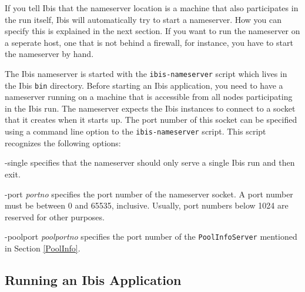 \documentclass[10pt]{article}
\newcommand{\mysubsection}[1]{\subsection{#1}\label{#1}}
\begin{document}
If you tell Ibis that the nameserver location is a machine that also
participates in the run itself, Ibis will automatically try to start
a nameserver. How you can specify this is explained in the next section.
If you want to run the nameserver on a seperate host, one that is not
behind a firewall, for instance, you have to start the nameserver by
hand.

The Ibis nameserver is started with the \texttt{ibis-nameserver} script which
lives in the Ibis \texttt{bin} directory. Before starting an Ibis application,
you need to have a nameserver running on a machine that is accessible
from all nodes participating in the Ibis run.
The nameserver expects the Ibis instances to connect to a
socket that it creates when it starts up.
The port number of this socket can be specified using a command line
option to the \texttt{ibis-nameserver} script. This script recognizes
the following options:
\begin{description}
\item{-single}
specifies that the nameserver should only serve a single Ibis run
and then exit.
\item{-port \emph{portno}}
specifies the port number of the nameserver socket.
A port number must be between 0 and 65535, inclusive. Usually,
port numbers below 1024 are reserved for other purposes.
\item{-poolport \emph{poolportno}}
specifies the port number of the \texttt{PoolInfoServer} mentioned
in Section \ref{PoolInfo}.
\end{description}

\mysubsection{Running an Ibis Application}
\end{document}

